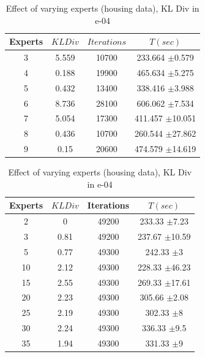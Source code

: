 \documentclass{acm_proc_article-sp}
\begin{document}
\begin{table}[htdp]
\parbox{.39\linewidth}{
\centering
\begin{tabular}{| c | c | c | c |}
\hline
Experts & $KL Div$ & $Iterations$ & $T(sec)$  \\
\hline
3 & 5.559  & 10700 & 233.664 $\pm$0.579 \\
4 & 0.188 & 19900 & 465.634 $\pm$5.275  \\
5 & 0.432  & 13400 & 338.416 $\pm$3.988  \\
6 & 8.736  & 28100 & 606.062 $\pm$7.534 \\
7 & 5.054  & 17300 & 411.457 $\pm$10.051\\
8 & 0.436 & 10700 & 260.544 $\pm$27.862 \\
9 & 0.15 & 20600 & 474.579 $\pm$14.619 \\
\hline
\end{tabular}
\caption{Effect of varying experts (REDD)}
\label{table:expert1}}
\hfill
\parbox{.65\linewidth}{
\centering
\begin{tabular}{| c | c | c | c |}
\hline
Experts & $KL Div$ & Iterations & $T(sec)$\\
\hline
2 & 0 & 49200 & 233.33 $\pm$7.23 \\
3 & 0.81 & 49200 & 237.67 $\pm$10.59 \\
5 & 0.77 & 49300 & 242.33 $\pm$3 \\
10 & 2.12 & 49300 & 228.33 $\pm$46.23 \\
15 & 2.55 & 49300 & 269.33 $\pm$17.61 \\
20 & 2.23 & 49300 & 305.66 $\pm$2.08  \\
25 & 2.19 & 49300 & 302.33 $\pm$8 \\
30 & 2.24 & 49300 & 336.33 $\pm$9.5 \\
35 & 1.94 & 49300 & 331.33 $\pm$9 \\
\hline
\end{tabular}
\caption{Effect of varying experts (housing data), KL Div in e-04}
\label{table:expert2}
}
\end{table}

%
\end{document}
